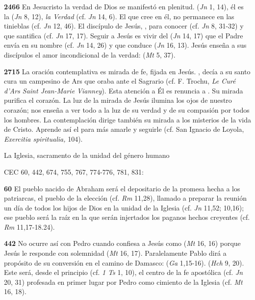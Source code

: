 \begin{body}
\begin{body}
{\textbf{2466} En Jesucristo la verdad de Dios se manifestó en plenitud.  (\emph{Jn} 1, 14), él es la  (\emph{Jn} 8, 12), \emph{la Verdad} (cf. \emph{Jn} 14, 6). El que cree en él, no permanece en las tinieblas (cf. \emph{Jn} 12, 46). El discípulo de Jesús, , para conocer  (cf. \emph{Jn} 8, 31-32) y que santifica (cf. \emph{Jn} 17, 17). Seguir a Jesús es vivir del  (\emph{Jn} 14, 17) que el Padre envía en su nombre (cf. \emph{Jn} 14, 26) y que conduce  (\emph{Jn} 16, 13). Jesús enseña a sus discípulos el amor incondicional de la verdad:  (\emph{Mt} 5, 37).

\textbf{2715} La oración contemplativa es mirada de fe, fijada en Jesús. , decía a su santo cura un campesino de Ars que oraba ante el Sagrario (cf. F. Trochu, \emph{Le Curé d'Ars Saint Jean-Marie Vianney}). Esta atención a Él es renuncia a . Su mirada purifica el corazón. La luz de la mirada de Jesús ilumina los ojos de nuestro corazón; nos enseña a ver todo a la luz de su verdad y de su compasión por todos los hombres. La contemplación dirige también su mirada a los misterios de la vida de Cristo. Aprende así el  para más amarle y seguirle (cf. San Ignacio de Loyola, \emph{Exercitia spiritualia,} 104).

La Iglesia, sacramento de la unidad del género humano

CEC 60, 442, 674, 755, 767, 774-776, 781, 831:

\textbf{60} El pueblo nacido de Abraham será el depositario de la promesa hecha a los patriarcas, el pueblo de la elección (cf. \emph{Rm} 11,28), llamado a preparar la reunión un día de todos los hijos de Dios en la unidad de la Iglesia (cf. \emph{Jn} 11,52; 10,16); ese pueblo será la raíz en la que serán injertados los paganos hechos creyentes (cf. \emph{Rm} 11,17-18.24).

\textbf{442} No ocurre así con Pedro cuando confiesa a Jesús como  (\emph{Mt} 16, 16) porque Jesús le responde con solemnidad  (\emph{Mt} 16, 17). Paralelamente Pablo dirá a propósito de su conversión en el camino de Damasco:  (\emph{Ga} 1,15-16).  (\emph{Hch} 9, 20). Este será, desde el principio (cf. \emph{1 Ts} 1, 10), el centro de la fe apostólica (cf. \emph{Jn} 20, 31) profesada en primer lugar por Pedro como cimiento de la Iglesia (cf. \emph{Mt} 16, 18).

}
\end{body}
\end{body}

